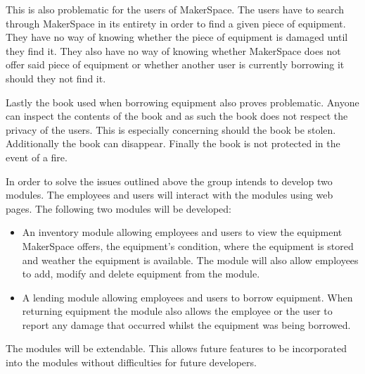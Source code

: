 This is also problematic for the users of MakerSpace.
The users have to search through MakerSpace in its entirety in order to find a given piece of equipment.
They have no way of knowing whether the piece of equipment is damaged until they find it.
They also have no way of knowing whether MakerSpace does not offer said piece of equipment or whether another user is currently borrowing it should they not find it.

Lastly the book used when borrowing equipment also proves problematic.
Anyone can inspect the contents of the book and as such the book does not respect the privacy of the users.
This is especially concerning should the book be stolen.
Additionally the book can disappear.
Finally the book is not protected in the event of a fire.


In order to solve the issues outlined above the group intends to develop two modules.
The employees and users will interact with the modules using web pages.
The following two modules will be developed:
\begin{itemize}
    \item An inventory module allowing employees and users to view the equipment MakerSpace offers, the equipment's condition, where the equipment is stored and weather the equipment is available.
    The module will also allow employees to add, modify and delete equipment from the module.
    \item A lending module allowing employees and users to borrow equipment.
    When returning equipment the module also allows the employee or the user to report any damage that occurred whilst the equipment was being borrowed.
\end{itemize}

The modules will be extendable.
This allows future features to be incorporated into the modules without difficulties for future developers.

